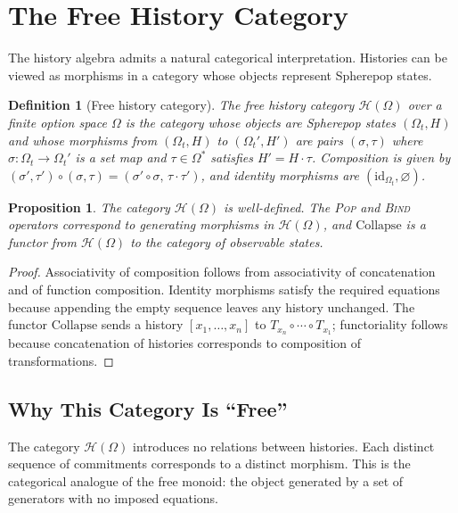 \documentclass[12pt]{article}
\newtheorem{definition}{Definition}[section]
\newtheorem{proposition}{Proposition}[section]
\begin{document}
\section{The Free History Category}
\label{sec:historycategory}

The history algebra admits a natural categorical interpretation. Histories can be viewed as morphisms in a category whose objects represent Spherepop states.

\begin{definition}[Free history category]
\label{def:freehist}
The \emph{free history category} $\mathcal{H}(\Omega)$ over a finite option space $\Omega$ is the category whose objects are Spherepop states $(\Omega_t, H)$ and whose morphisms from $(\Omega_t, H)$ to $(\Omega_t', H')$ are pairs $(\sigma, \tau)$ where $\sigma : \Omega_t \to \Omega_t'$ is a set map and $\tau \in \Omega^*$ satisfies $H' = H \cdot \tau$. Composition is given by $(\sigma', \tau') \circ (\sigma, \tau) = (\sigma' \circ \sigma,\, \tau \cdot \tau')$, and identity morphisms are $(\mathrm{id}_{\Omega_t}, \varnothing)$.
\end{definition}

\begin{proposition}
The category $\mathcal{H}(\Omega)$ is well-defined. The \textsc{Pop} and \textsc{Bind} operators correspond to generating morphisms in $\mathcal{H}(\Omega)$, and $\mathrm{Collapse}$ is a functor from $\mathcal{H}(\Omega)$ to the category of observable states.
\end{proposition}

\begin{proof}
Associativity of composition follows from associativity of concatenation and of function composition. Identity morphisms satisfy the required equations because appending the empty sequence leaves any history unchanged. The functor $\mathrm{Collapse}$ sends a history $[x_1,\ldots,x_n]$ to $T_{x_n} \circ \cdots \circ T_{x_1}$; functoriality follows because concatenation of histories corresponds to composition of transformations.
\end{proof}

\subsection{Why This Category Is ``Free''}

The category $\mathcal{H}(\Omega)$ introduces no relations between histories. Each distinct sequence of commitments corresponds to a distinct morphism. This is the categorical analogue of the free monoid: the object generated by a set of generators with no imposed equations.
\end{document}
